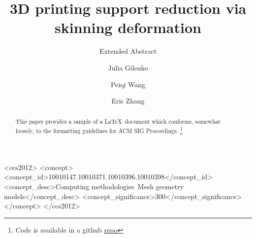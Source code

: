 \documentclass[sigconf]{acmart}
\begin{document}
\title{3D printing support reduction via skinning deformation}
\subtitle{Extended Abstract}

\author{Julia Gilenko}

\author{Peiqi Wang}

\author{Eris Zhang}

\renewcommand{\shortauthors}{Julia G. Mark W. Eris Z.}
 

\begin{abstract}
This paper provides a sample of a \LaTeX\ document which conforms,
somewhat loosely, to the formatting guidelines for
ACM SIG Proceedings. \footnote{Code is available in a github \href{https://github.com/tt6746690/fast_support_reduction/}{repo}}
\end{abstract}

%
%
\begin{CCSXML}
    <ccs2012>
    <concept>
    <concept_id>10010147.10010371.10010396.10010398</concept_id>
    <concept_desc>Computing methodologies~Mesh geometry models</concept_desc>
    <concept_significance>300</concept_significance>
    </concept>
    </ccs2012>
\end{CCSXML}



\maketitle





\end{document}
